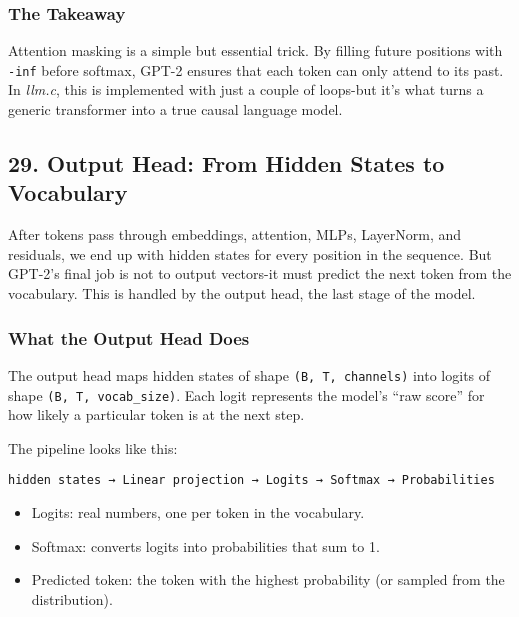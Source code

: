 \documentclass[
  letterpaper,
  DIV=11,
  numbers=noendperiod]{scrreprt}
\providecommand{\tightlist}{%
  \setlength{\itemsep}{0pt}\setlength{\parskip}{0pt}}
\begin{document}
\subsubsection{The Takeaway}\label{the-takeaway-17}

Attention masking is a simple but essential trick. By filling future
positions with \texttt{-inf} before softmax, GPT-2 ensures that each
token can only attend to its past. In \emph{llm.c}, this is implemented
with just a couple of loops-but it's what turns a generic transformer
into a true causal language model.

\subsection{29. Output Head: From Hidden States to
Vocabulary}\label{output-head-from-hidden-states-to-vocabulary}

After tokens pass through embeddings, attention, MLPs, LayerNorm, and
residuals, we end up with hidden states for every position in the
sequence. But GPT-2's final job is not to output vectors-it must predict
the next token from the vocabulary. This is handled by the output head,
the last stage of the model.

\subsubsection{What the Output Head
Does}\label{what-the-output-head-does}

The output head maps hidden states of shape \texttt{(B,\ T,\ channels)}
into logits of shape \texttt{(B,\ T,\ vocab\_size)}. Each logit
represents the model's ``raw score'' for how likely a particular token
is at the next step.

The pipeline looks like this:

\begin{verbatim}
hidden states → Linear projection → Logits → Softmax → Probabilities
\end{verbatim}

\begin{itemize}
\tightlist
\item
  Logits: real numbers, one per token in the vocabulary.
\item
  Softmax: converts logits into probabilities that sum to 1.
\item
  Predicted token: the token with the highest probability (or sampled
  from the distribution).
\end{itemize}
\end{document}

